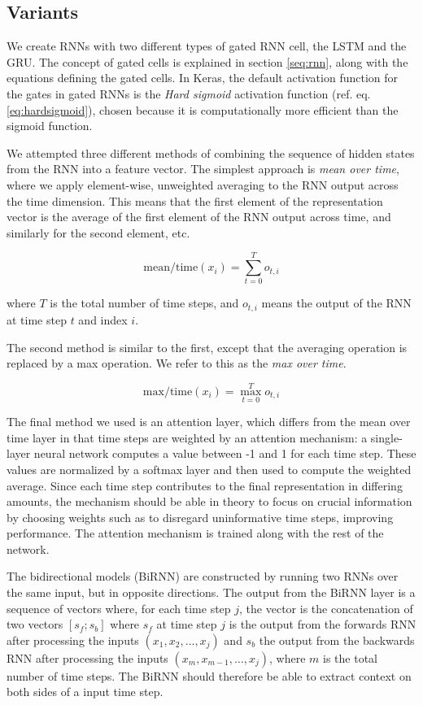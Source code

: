 \subsection{Variants}

We create \acp{RNN} with two different types of gated \ac{RNN} cell, the
\ac{LSTM} and the \ac{GRU}. The concept of gated cells is explained in
section \ref{seq:rnn}, along with the equations defining the gated cells. In
Keras, the default activation function for the gates in gated RNNs is the
\emph{Hard sigmoid} activation function (ref. eq. \ref{eq:hardsigmoid}),
chosen because it is computationally more efficient than the sigmoid
function.

We attempted three different methods of combining the sequence of hidden
states from the \ac{RNN} into a feature vector. The simplest approach is
\emph{mean over time}, where we apply element-wise, unweighted averaging to
the RNN output across the time dimension. This means that the first element
of the representation vector is the average of the first element of the RNN
output across time, and similarly for the second element, etc.

\[
  \mathrm{mean/time}(x_i) = \sum_{t=0}^T o_{t,i}
\]

where $T$ is the total number of time steps, and $o_{t,i}$ means the output of
the RNN at time step $t$ and index $i$.

The second method is similar to the first, except that the averaging
operation is replaced by a max operation. We refer to this as the \emph{max
over time}.

\[
  \mathrm{max/time}(x_i) = \max_{t=0}^T o_{t,i}
\]

The final method we used is an attention layer, which differs from the mean
over time layer in that time steps are weighted by an attention mechanism: a
single-layer neural network computes a value between -1 and 1 for each time
step. These values are normalized by a softmax layer and then used to compute
the weighted average. Since each time step contributes to the final
representation in differing amounts, the mechanism should be able in theory
to focus on crucial information by choosing weights such as to disregard
uninformative time steps, improving performance. The attention mechanism is
trained along with the rest of the network.

The bidirectional models (BiRNN) are constructed by running two \acp{RNN}
over the same input, but in opposite directions. The output from the BiRNN
layer is a sequence of vectors where, for each time step $j$, the vector is
the concatenation of two vectors $[s_f;s_b]$ where $s_f$ at time step $j$ is
the output from the forwards \ac{RNN} after processing the inputs $(x_1, x_2,
\ldots, x_j)$ and $s_b$ the output from the backwards \ac{RNN} after
processing the inputs $(x_m, x_{m-1}, \ldots, x_j)$, where $m$ is the total
number of time steps. The BiRNN should therefore be able to extract context
on both sides of a input time step.

